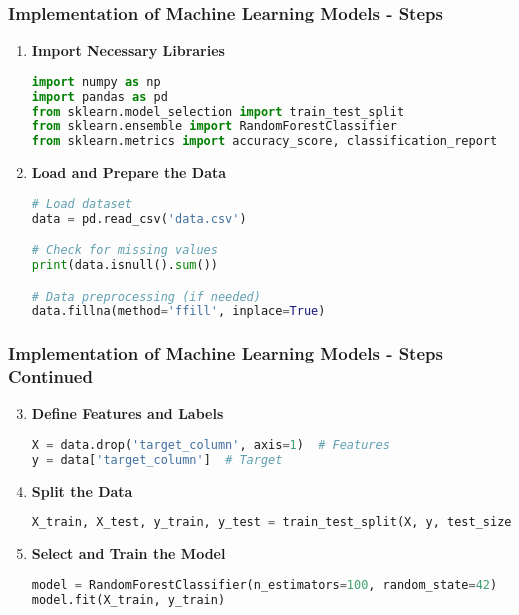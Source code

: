 \documentclass[aspectratio=169]{beamer}
\begin{document}
\begin{frame}[fragile]
    \frametitle{Implementation of Machine Learning Models - Steps}
    \begin{enumerate}
        \item \textbf{Import Necessary Libraries}
        \begin{lstlisting}[language=Python]
import numpy as np
import pandas as pd
from sklearn.model_selection import train_test_split
from sklearn.ensemble import RandomForestClassifier
from sklearn.metrics import accuracy_score, classification_report
        \end{lstlisting}

        \item \textbf{Load and Prepare the Data}
        \begin{lstlisting}[language=Python]
# Load dataset
data = pd.read_csv('data.csv')

# Check for missing values
print(data.isnull().sum())

# Data preprocessing (if needed)
data.fillna(method='ffill', inplace=True)
        \end{lstlisting}
    \end{enumerate}
\end{frame}

\begin{frame}[fragile]
    \frametitle{Implementation of Machine Learning Models - Steps Continued}
    \begin{enumerate}
        \setcounter{enumi}{2}
        \item \textbf{Define Features and Labels}
        \begin{lstlisting}[language=Python]
X = data.drop('target_column', axis=1)  # Features
y = data['target_column']  # Target
        \end{lstlisting}

        \item \textbf{Split the Data}
        \begin{lstlisting}[language=Python]
X_train, X_test, y_train, y_test = train_test_split(X, y, test_size=0.2, random_state=42)
        \end{lstlisting}

        \item \textbf{Select and Train the Model}
        \begin{lstlisting}[language=Python]
model = RandomForestClassifier(n_estimators=100, random_state=42)
model.fit(X_train, y_train)
        \end{lstlisting}
    \end{enumerate}
\end{frame}
\end{document}

